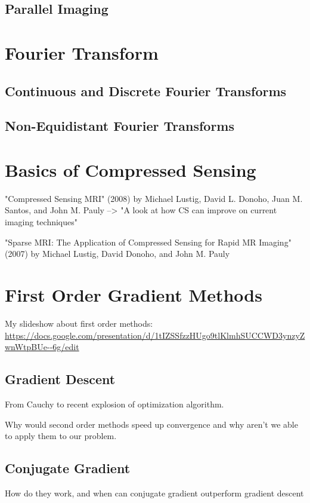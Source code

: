 \subsection{Parallel Imaging}

\section{Fourier Transform}
\subsection{Continuous and Discrete Fourier Transforms}
\subsection{Non-Equidistant Fourier Transforms}

\section{Basics of Compressed Sensing}
"Compressed Sensing MRI" (2008) by Michael Lustig, David L. Donoho, Juan M. Santos, and John M. Pauly --> "A look at how CS can improve on current imaging techniques"

"Sparse MRI: The Application of Compressed Sensing for Rapid MR Imaging" (2007) by Michael Lustig, David Donoho, and John M. Pauly

\section{First Order Gradient Methods}

My slideshow about first order methods: \url{https://docs.google.com/presentation/d/1tIZSSfzzHUgo9tlKlmhSUCCWD3ynzyZwnWtpBUe--6g/edit}

\subsection{Gradient Descent}
From Cauchy to recent explosion of optimization algorithm.

Why would second order methods speed up convergence and why aren't we able to apply them to our problem.

\subsection{Conjugate Gradient}
How do they work, and when can conjugate gradient outperform gradient descent

